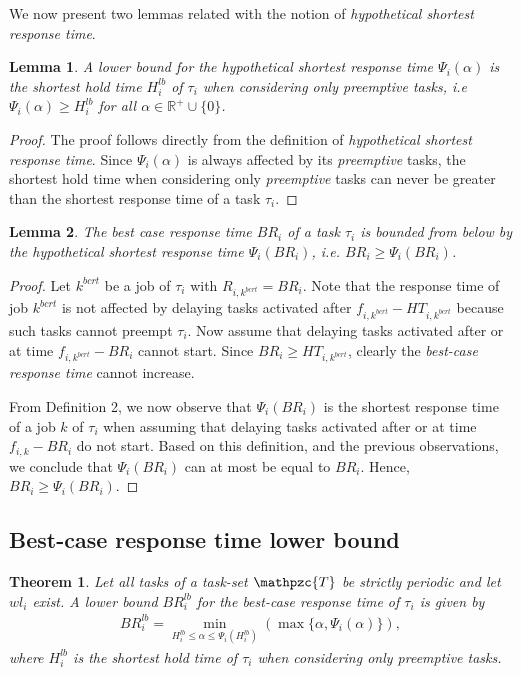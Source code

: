 \documentclass[fleqn]{article}
\newtheorem{theorem}{Theorem}
\newtheorem{lemma}{Lemma}
\begin{document}
We now present two lemmas related with the notion of \textit{hypothetical shortest response time}.

\begin{lemma} \label{hrt_lb}
	A lower bound for the \textit{hypothetical shortest response time} $\Psi_i(\alpha)$ is the shortest hold time $H^{lb}_i$ of $\tau_i$ when considering only preemptive tasks, i.e $\Psi_i(\alpha) \geq H^{lb}_i$ for all $\alpha \in \mathbb{R^+} \cup \{0\}$.
\end{lemma}

\begin{proof}
	The proof follows directly from the definition of \textit{hypothetical shortest response time}. Since $\Psi_i(\alpha)$ is always affected by its \textit{preemptive} tasks, the shortest hold time when considering only \textit{preemptive} tasks can never be greater than the shortest response time of a task $\tau_i$.
\end{proof}

\begin{lemma} \label{bcrt_lb}
	The \textit{best case response time} $BR_i$ of a task $\tau_i$ is bounded from below by the \textit{hypothetical shortest response time} $\Psi_i(BR_i)$, i.e. $BR_i \geq \Psi_i(BR_i)$.
\end{lemma}

\begin{proof}
	Let $k^{bcrt}$ be a job of $\tau_i$ with $R_{i,k^{bcrt}}=BR_i$. Note that the response time of job $k^{bcrt}$ is not affected by delaying tasks activated after $f_{i,k^{bcrt}} - HT_{i,k^{bcrt}}$ because such tasks cannot preempt $\tau_i$. Now assume that delaying tasks activated after or at time $f_{i,k^{bcrt}} - BR_i$ cannot start. Since $BR_i \geq HT_{i,k^{bcrt}}$, clearly the \textit{best-case response time} cannot increase. 
	
	From Definition 2, we now observe that $\Psi_i(BR_i)$ is the shortest response time of a job $k$ of $\tau_i$ when assuming that delaying tasks activated after or at time $f_{i,k} - BR_i$ do not start. Based on this definition, and the previous observations, we conclude that $\Psi_i(BR_i)$ can at most be equal to $BR_i$. Hence, $BR_i \geq \Psi_i(BR_i)$.
\end{proof}


\subsection{Best-case response time lower bound}
\begin{theorem}
	Let all tasks of a task-set $\mathpzc{T}$ be strictly periodic and let $wl_i$ exist. A lower bound $BR^{lb}_i$ for the \textit{best-case response time} of $\tau_i$ is given by
	\begin{align}
	BR^{lb}_i = \min \limits_{H_i^{lb} \leq \alpha \leq \Psi_i(H_i^{lb})} (\max \{ \alpha, \Psi_i(\alpha) \}),
	\end{align}
	where $H_i^{lb}$ is the shortest hold time of $\tau_i$ when considering only preemptive tasks.
\end{theorem}
\end{document}

